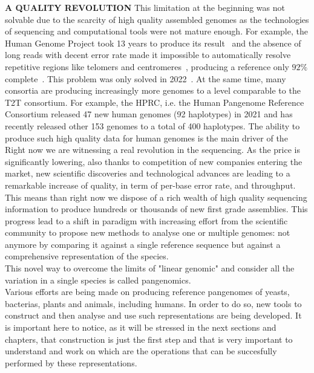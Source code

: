 \huge{\textbf{A QUALITY REVOLUTION}}
This limitation at the beginning was not solvable due to the scarcity of high quality assembled genomes as the technologies of sequencing and computational tools were not mature enough. For example, the Human Genome Project took 13 years to produce its result~\cite{humangenomeproject} and the absence of long reads with decent error rate made it impossible to automatically resolve repetitive regions like telomers and centromeres~\cite{human-pangenomics-era}, producing a reference only $92\%$ complete~\cite{t2t}. This problem was only solved in 2022~\cite{t2t}. At the same time, many consortia are producing increasingly more genomes to a level comparable to the T2T consortium. For example, the HPRC, i.e. the Human Pangenome Reference Consortium released 47 new human genomes (92 haplotypes) in 2021 and has recently released other 153 genomes to a total of 400 haplotypes. The ability to produce such high quality data for human genomes is the main driver of the \\
Right now we are witnessing a real revolution in the sequencing. As the price is significantly lowering, also thanks to competition of new companies entering the market, new scientific discoveries and technological advances are leading to a remarkable increase of quality, in term of per-base error rate, and throughput. This means than right now we dispose of a rich wealth of high quality sequencing information to produce hundreds or thousands of new first grade assemblies.
This progress lead to a shift in paradigm with increasing effort from the scientific community to propose new methods to analyse one or multiple genomes: not anymore by comparing it against a single reference sequence but against a comprehensive representation of the species. \\
This novel way to overcome the limits of "linear genomic" and consider all the variation in a single species is called pangenomics. \\
Various efforts are being made on producing reference pangenomes of yeasts, bacterias, plants and animals, including humans. In order to do so, new tools to construct and then analyse and use such representations are being developed. 
It is important here to notice, as it will be stressed in the next sections and chapters, that construction is just the first step and that is very important to understand and work on which are the operations that can be succesfully performed by these representations. \\

